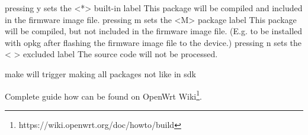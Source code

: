 pressing y sets the <*> built-in label
This package will be compiled and included in the firmware image file.
pressing m sets the <M> package label
This package will be compiled, but not included in the firmware image file. (E.g. to be installed with opkg after flashing the firmware image file to the device.)
pressing n sets the < > excluded label
The source code will not be processed.

make will trigger making all packages not like in sdk

\cite{build_owrt}

Complete guide how can be found on OpenWrt Wiki\footnote{https://wiki.openwrt.org/doc/howto/build}.
